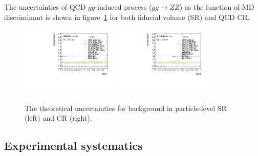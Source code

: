 The uncertainties of QCD $gg$-induced process ($gg \rightarrow ZZ$) as the function of MD discriminant is shown in figure~\ref{fig:syst_theo_gg} for both fiducial volume (SR) and QCD CR.
\begin{figure}
  \centering
  \includegraphics[width=0.42\textwidth]{figures/VBSZZ/syst/BDT_SR_linear.pdf}
  \includegraphics[width=0.42\textwidth]{figures/VBSZZ/syst/BDT_CR_linear.pdf}
  \caption{The theoretical uncertainties for \ggZZ background in particle-level SR (left) and CR (right).}
  \label{fig:syst_theo_gg}
\end{figure}

\subsection{Experimental systematics}
\label{sec:vbszz_exp_uncer}

